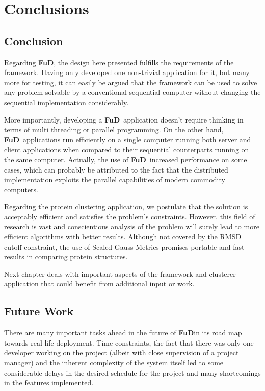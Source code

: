 \documentclass[a4paper,12pt,english]{report}
\newcommand{\fud}{\textbf{FuD}}
\begin{document}

\part{Conclusions}\label{conclusions}

\chapter{Conclusion}

Regarding \fud, the design here presented fulfills the requirements of the framework. Having only developed one non-trivial application for it, but many more for testing, it can easily be argued that the framework can be used to solve any problem solvable by a conventional sequential computer without changing the sequential implementation considerably. 

More importantly, developing a \fud \ application doesn't require thinking in terms of multi threading or parallel programming. On the other hand, \fud \ applications run efficiently on a single computer running both server and client applications when compared to their sequential counterparts running on the same computer. Actually, the use of \fud \ increased performance on some cases, which can probably be attributed to the fact that the distributed implementation exploits the parallel capabilities of modern commodity computers.

Regarding the protein clustering application, we postulate that the solution is acceptably efficient and satisfies the problem's constraints. However, this field of research is vast and conscientious analysis of the problem will surely lead to more efficient algorithms with better results. Although not covered by the RMSD cutoff constraint, the use of Scaled Gauss Metrics promises portable and fast results in comparing protein structures.

Next chapter deals with important aspects of the framework and clusterer application that could benefit from additional input or work.

\chapter{Future Work}

There are many important tasks ahead in the future of \fud in its road map towards real life deployment. Time constraints, the fact that there was only one developer working on the project (albeit with close supervision of a project manager) and the inherent complexity of the system itself led to some considerable delays in the desired schedule for the project and many shortcomings in the features implemented.
\end{document}
